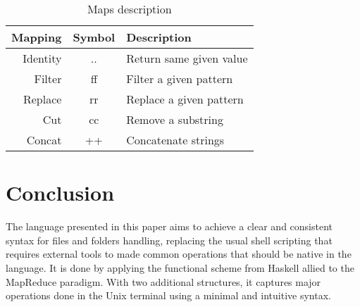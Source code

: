\documentclass{article}
\begin{document}
\begin{table}[ht]
\centering
\caption{Maps description}
\label{tab:maps}
\begin{tabular}{|r|c|l|}
\hline
Mapping   & Symbol & Description\\ \hline
Identity  & ..     & Return same given value \\
Filter    & ff     & Filter a given pattern \\
Replace   & rr     & Replace a given pattern \\
Cut       & cc     & Remove a substring \\
Concat    & ++     & Concatenate strings \\
\hline
\end{tabular}
\end{table}

\section{Conclusion}
\label{sec:conclusion}
The language presented in this paper aims to achieve a clear and consistent
syntax for files and folders handling, replacing the usual shell scripting that
requires external tools to made common operations that should be native in the
language. It is done by applying the functional scheme from Haskell allied to
the MapReduce paradigm. With two additional structures, it captures major
operations done in the Unix terminal using a minimal and intuitive syntax.



\end{document}
